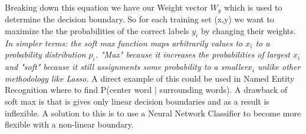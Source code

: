 \documentclass[12pt,a4paper]{report}
\begin{document}
Breaking down this equation we have our Weight vector $W_{y}$  which is used to determine the decision boundary. So for each training set (x,y) we want to maximize the the probabilities of the correct labels $y_{i}$ by changing their weights.\emph{ In simpler terms: the soft max function maps arbitrarily values to $ x_{i}$ to a probability distribution $ p_{i}$. "Max" because it increases the probabilities of largest $x_{i} $ and "soft" because it still assignments some probability to a smaller$ x_{i} $ unlike other methodology like Lasso. }A direct example of this could be used in Named Entity Recognition where to find P(center word | surrounding words). A drawback of soft max is that is gives only linear decision boundaries and as a result is inflexible. A solution to this is to use a Neural Network Classifier to become more flexible with a non-linear boundary.\\ 
\end{document}
